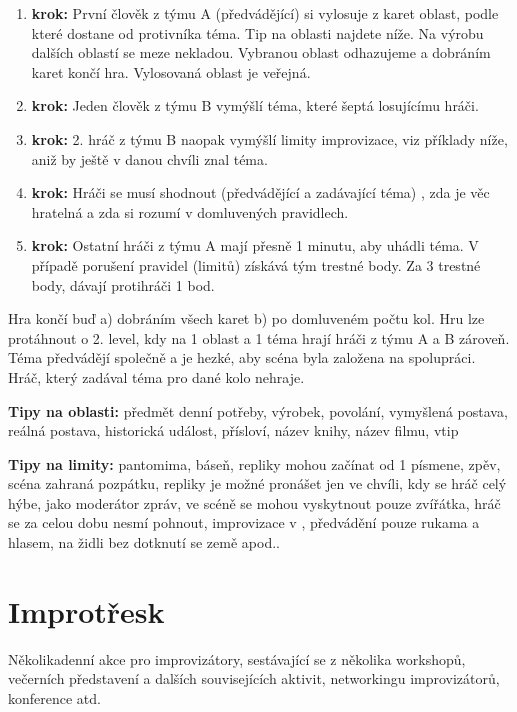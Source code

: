 \documentclass[main.tex]{subfiles}
\begin{document}
\begin{enumerate}
\item  \textbf{krok:}{} První člověk z týmu A (předvádějící) si vylosuje z karet oblast, podle které dostane od protivníka téma. Tip na oblasti najdete níže. Na výrobu dalších oblastí se meze nekladou. Vybranou oblast odhazujeme a dobráním karet končí hra. Vylosovaná oblast je veřejná.
\item  \textbf{krok:}{} Jeden člověk z týmu B vymýšlí téma, které šeptá losujícímu hráči.
\item  \textbf{krok:}{} 2. hráč z týmu B naopak vymýšlí limity improvizace, viz příklady níže, aniž by ještě v danou chvíli znal téma.
\item  \textbf{krok:}{} Hráči se musí shodnout (předvádějící a zadávající téma) , zda je věc hratelná a zda si rozumí v domluvených pravidlech.
\item  \textbf{krok:}{} Ostatní hráči z týmu A mají přesně 1 minutu, aby uhádli téma. V případě porušení pravidel (limitů) získává tým trestné body. Za 3 trestné body, dávají protihráči 1 bod.
\end{enumerate}
 
Hra končí buď a) dobráním všech karet b) po domluveném počtu kol. Hru lze protáhnout o 2. level, kdy na 1 oblast a 1 téma hrají hráči z týmu A a B zároveň. Téma předvádějí společně a je hezké, aby scéna byla založena na spolupráci. Hráč, který zadával téma pro dané kolo nehraje. 
 
\textbf{Tipy na oblasti:}{} 
předmět denní potřeby, výrobek, povolání, vymyšlená postava, reálná postava, historická událost, přísloví, název knihy, název filmu, vtip 
 
\textbf{Tipy na limity:}{} pantomima, báseň, repliky mohou začínat od 1 písmene, zpěv, scéna zahraná pozpátku, repliky je možné pronášet jen ve chvíli, kdy se hráč celý hýbe, jako moderátor zpráv, ve scéně se mohou vyskytnout pouze zvířátka, hráč se za celou dobu nesmí pohnout, improvizace v , předvádění pouze rukama a hlasem, na židli bez dotknutí se země apod.. 
 
 
\needspace{5cm} \section{Improtřesk} \label{improtřesk} Několikadenní akce pro improvizátory, sestávající se z několika workshopů, večerních představení a dalších souvisejících aktivit, networkingu improvizátorů, konference atd. 
 
\end{document}
